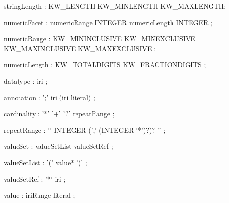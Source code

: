 \documentclass{article}
\def\bnf#1{{\scriptsize {{#1}} }}
\begin{document}
\begin{framed}
\noindent
\bnf{stringLength    : KW\_LENGTH \textbar  KW\_MINLENGTH \textbar  KW\_MAXLENGTH;}
\end{framed}


\begin{framed}
\noindent
\bnf{numericFacet    : numericRange INTEGER \textbar  numericLength INTEGER ;}
\end{framed}


\begin{framed}
\noindent
\bnf{numericRange    : KW\_MININCLUSIVE \textbar  KW\_MINEXCLUSIVE \textbar  KW\_MAXINCLUSIVE \textbar  KW\_MAXEXCLUSIVE ;}
\end{framed}


\begin{framed}
\noindent
\bnf{numericLength   : KW\_TOTALDIGITS \textbar  KW\_FRACTIONDIGITS ;}
\end{framed}


\begin{framed}
\noindent
\bnf{datatype        : iri ;}
\end{framed}


\begin{framed}
\noindent
\bnf{annotation      : ';' iri (iri \textbar  literal) ;}
\end{framed}


\begin{framed}
\noindent
\bnf{cardinality     :  '*' \textbar  '+' \textbar  '?' \textbar  repeatRange ;}
\end{framed}


\begin{framed}
\noindent
\bnf{repeatRange     : '{' INTEGER (',' (INTEGER \textbar  '*')?)? '}' ;}
\end{framed}


\begin{framed}
\noindent
\bnf{valueSet        : valueSetList \textbar  valueSetRef ;}
\end{framed}


\begin{framed}
\noindent
\bnf{valueSetList    : '(' value* ')' ;}
\end{framed}


\begin{framed}
\noindent
\bnf{valueSetRef     : '*' iri ;}
\end{framed}


\begin{framed}
\noindent
\bnf{value           : iriRange \textbar  literal ;}
\end{framed}
\end{document}
